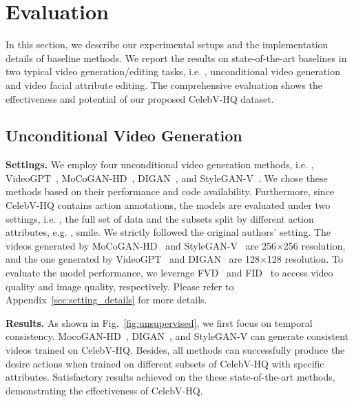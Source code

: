 \section{Evaluation}

In this section, we describe our experimental setups and the implementation details of baseline methods. We report the results on state-of-the-art baselines in two typical video generation/editing tasks, i.e. , unconditional video generation and video facial attribute editing. The comprehensive evaluation shows the effectiveness and potential of our proposed CelebV-HQ dataset.

\subsection{Unconditional Video Generation}

\begin{sloppypar}

\textbf{Settings.} We employ four unconditional video generation methods, i.e. , VideoGPT~\cite{yan2021videogpt}, MoCoGAN-HD~\cite{mocoganhd}, DIGAN~\cite{digan}, and StyleGAN-V~\cite{styleganv}. We chose these methods based on their performance and code availability. Furthermore, since CelebV-HQ contains action annotations, the models are evaluated under two settings, i.e. , the full set of data and the subsets split by different action attributes, e.g. , smile. We strictly followed the original authors' setting. The videos generated by MoCoGAN-HD~\cite{mocoganhd} and StyleGAN-V~\cite{styleganv} are 256$\times$256 resolution, and the one generated by VideoGPT~\cite{yan2021videogpt} and DIGAN~\cite{digan} are 128$\times$128 resolution. To evaluate the model performance, we leverage FVD~\cite{fvd} and FID~\cite{fid} to access video quality and image quality, respectively. Please refer to Appendix~\ref{sec:setting_details} for more details.
\end{sloppypar}

\textbf{Results.}
As shown in Fig.~\ref{fig:unsupervised}, we first focus on temporal consistency. MocoGAN-HD~\cite{mocoganhd}, DIGAN~\cite{digan}, and StyleGAN-V\cite{styleganv} can generate consistent videos trained on CelebV-HQ. Besides, all methods can successfully produce the desire actions when trained on different subsets of CelebV-HQ with specific attributes. Satisfactory results achieved on the these state-of-the-art methods, demonstrating the effectiveness of CelebV-HQ. 

